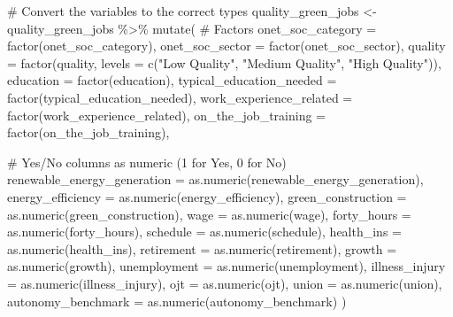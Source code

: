 \documentclass[
  letterpaper,
  DIV=11,
  numbers=noendperiod]{scrartcl}
\newenvironment{Shaded}{\begin{snugshade}}{\end{snugshade}}
\newcommand{\AttributeTok}[1]{\textcolor[rgb]{0.40,0.45,0.13}{#1}}
\newcommand{\CommentTok}[1]{\textcolor[rgb]{0.37,0.37,0.37}{#1}}
\newcommand{\FunctionTok}[1]{\textcolor[rgb]{0.28,0.35,0.67}{#1}}
\newcommand{\NormalTok}[1]{\textcolor[rgb]{0.00,0.23,0.31}{#1}}
\newcommand{\OtherTok}[1]{\textcolor[rgb]{0.00,0.23,0.31}{#1}}
\newcommand{\SpecialCharTok}[1]{\textcolor[rgb]{0.37,0.37,0.37}{#1}}
\newcommand{\StringTok}[1]{\textcolor[rgb]{0.13,0.47,0.30}{#1}}
\begin{document}
\begin{Shaded}
\begin{Highlighting}[]
\CommentTok{\# Convert the variables to the correct types}
\NormalTok{quality\_green\_jobs }\OtherTok{\textless{}{-}}\NormalTok{ quality\_green\_jobs }\SpecialCharTok{\%\textgreater{}\%}
  \FunctionTok{mutate}\NormalTok{(}
    \CommentTok{\# Factors}
    \AttributeTok{onet\_soc\_category =} \FunctionTok{factor}\NormalTok{(onet\_soc\_category),}
    \AttributeTok{onet\_soc\_sector =} \FunctionTok{factor}\NormalTok{(onet\_soc\_sector),}
    \AttributeTok{quality =} \FunctionTok{factor}\NormalTok{(quality, }\AttributeTok{levels =} \FunctionTok{c}\NormalTok{(}\StringTok{"Low Quality"}\NormalTok{, }\StringTok{"Medium Quality"}\NormalTok{, }\StringTok{"High Quality"}\NormalTok{)),}
    \AttributeTok{education =} \FunctionTok{factor}\NormalTok{(education),}
    \AttributeTok{typical\_education\_needed =} \FunctionTok{factor}\NormalTok{(typical\_education\_needed),}
    \AttributeTok{work\_experience\_related =} \FunctionTok{factor}\NormalTok{(work\_experience\_related),}
    \AttributeTok{on\_the\_job\_training =} \FunctionTok{factor}\NormalTok{(on\_the\_job\_training),}
    
    \CommentTok{\# Yes/No columns as numeric (1 for Yes, 0 for No)}
    \AttributeTok{renewable\_energy\_generation =} \FunctionTok{as.numeric}\NormalTok{(renewable\_energy\_generation),}
    \AttributeTok{energy\_efficiency =} \FunctionTok{as.numeric}\NormalTok{(energy\_efficiency),}
    \AttributeTok{green\_construction =} \FunctionTok{as.numeric}\NormalTok{(green\_construction),}
    \AttributeTok{wage =} \FunctionTok{as.numeric}\NormalTok{(wage),}
    \AttributeTok{forty\_hours =} \FunctionTok{as.numeric}\NormalTok{(forty\_hours),}
    \AttributeTok{schedule =} \FunctionTok{as.numeric}\NormalTok{(schedule),}
    \AttributeTok{health\_ins =} \FunctionTok{as.numeric}\NormalTok{(health\_ins),}
    \AttributeTok{retirement =} \FunctionTok{as.numeric}\NormalTok{(retirement),}
    \AttributeTok{growth =} \FunctionTok{as.numeric}\NormalTok{(growth),}
    \AttributeTok{unemployment =} \FunctionTok{as.numeric}\NormalTok{(unemployment),}
    \AttributeTok{illness\_injury =} \FunctionTok{as.numeric}\NormalTok{(illness\_injury),}
    \AttributeTok{ojt =} \FunctionTok{as.numeric}\NormalTok{(ojt),}
    \AttributeTok{union =} \FunctionTok{as.numeric}\NormalTok{(union),}
    \AttributeTok{autonomy\_benchmark =} \FunctionTok{as.numeric}\NormalTok{(autonomy\_benchmark)}
\NormalTok{  )}
\end{Highlighting}
\end{Shaded}
\end{document}
